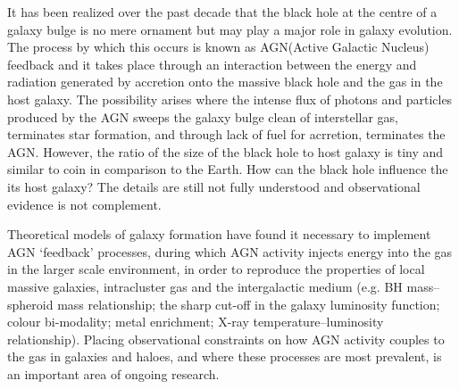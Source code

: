\documentclass[../main.tex]{subfiles}
\begin{document}
It has been realized over the past decade that the black hole at the centre of a galaxy bulge is no mere ornament but may play a major role in galaxy evolution. The process by which this occurs is known as AGN(Active Galactic Nucleus) feedback and it takes place through an interaction between the energy and radiation generated by accretion onto the massive black hole and the gas in the host galaxy. The possibility arises where the intense flux of photons and particles produced by the AGN sweeps the galaxy bulge clean of interstellar gas, terminates star formation, and through lack of fuel for acrretion, terminates the AGN. However, the ratio of the size of the black hole to host galaxy is tiny and similar to coin in comparison to the Earth. How can the black hole influence the its host galaxy? The details are still not fully understood and observational evidence is not complement.

Theoretical models of galaxy formation have found it necessary to implement AGN ‘feedback’ processes, during which AGN activity injects energy into the gas in the larger scale environment, in order to reproduce the properties of local massive galaxies, intracluster gas and the intergalactic medium (e.g. BH mass–spheroid mass relationship; the sharp cut-off in the galaxy luminosity function; colour bi-modality; metal enrichment; X-ray temperature–luminosity relationship). Placing observational constraints on how AGN activity couples to the gas in galaxies and haloes, and where these processes are most prevalent, is an important area of ongoing research.
\end{document}
